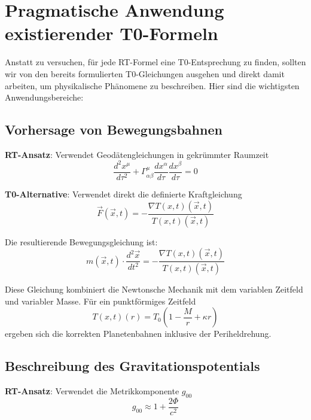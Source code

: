 \documentclass[12pt,a4paper]{article}
\newcommand{\Tfieldt}{T(x,t)}
\newcommand{\Tzero}{T_0}
\newcommand{\vecx}{\vec{x}}
\begin{document}
	\section{Pragmatische Anwendung existierender T0-Formeln}
	\label{sec:pragmatic_approach}
	
	Anstatt zu versuchen, für jede RT-Formel eine T0-Entsprechung zu finden, sollten wir von den bereits formulierten T0-Gleichungen ausgehen und direkt damit arbeiten, um physikalische Phänomene zu beschreiben. Hier sind die wichtigsten Anwendungsbereiche:
	
	\subsection{Vorhersage von Bewegungsbahnen}
	\label{subsec:trajectories}
	
	\textbf{RT-Ansatz}: Verwendet Geodätengleichungen in gekrümmter Raumzeit
	\begin{equation}
		\frac{d^2x^{\mu}}{d\tau^2} + \Gamma^{\mu}_{\alpha\beta} \frac{dx^{\alpha}}{d\tau} \frac{dx^{\beta}}{d\tau} = 0
	\end{equation}
	
	\textbf{T0-Alternative}: Verwendet direkt die definierte Kraftgleichung
	\begin{equation}
		\vec{F}(\vecx,t) = -\frac{\nabla\Tfieldt(\vecx,t)}{\Tfieldt(\vecx,t)}
	\end{equation}
	
	Die resultierende Bewegungsgleichung ist:
	\begin{equation}
		m(\vecx,t) \cdot \frac{d^2\vecx}{dt^2} = -\frac{\nabla\Tfieldt(\vecx,t)}{\Tfieldt(\vecx,t)}
	\end{equation}
	
	Diese Gleichung kombiniert die Newtonsche Mechanik mit dem variablen Zeitfeld und variabler Masse. Für ein punktförmiges Zeitfeld
	\begin{equation}
		\Tfieldt(r) = \Tzero\left(1 - \frac{M}{r} + \kappa r\right)
	\end{equation}
	ergeben sich die korrekten Planetenbahnen inklusive der Periheldrehung.
	
	\subsection{Beschreibung des Gravitationspotentials}
	\label{subsec:gravitational_potential}
	
	\textbf{RT-Ansatz}: Verwendet die Metrikkomponente $g_{00}$
	\begin{equation}
		g_{00} \approx 1 + \frac{2\Phi}{c^2}
	\end{equation}
	
\end{document}
